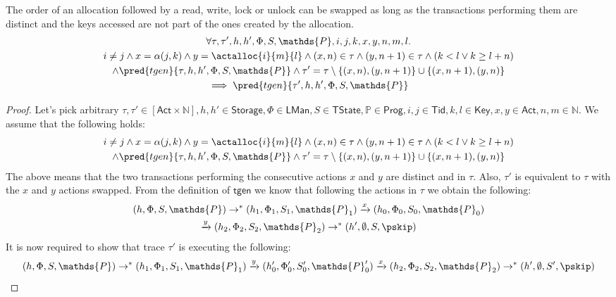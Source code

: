 \begin{lem}
	\label{lem:ax}
	The order of an allocation followed by a read, write, lock or unlock can be swapped as long as the transactions performing them are distinct and the keys accessed are not part of the ones created by the allocation.
	\begin{gather*}
		\forall \tau, \tau', h, h', \Phi, S, \mathds{P}, i, j, k, x, y, n, m, l \ldotp \\
			i \neq j \land x = \alpha(j, k) \land y = \actalloc{i}{m}{l} \land (x, n) \in \tau \land (y, n+1) \in \tau \land (k < l \lor k \geq l + n) \\ \land \pred{tgen}{\tau, h, h', \Phi, S, \mathds{P}} \land \tau' = \tau \setminus \{(x, n), (y, n+1)\} \cup \{ (x, n+1), (y, n) \}
			\\	 
		 \implies \pred{tgen}{\tau', h, h', \Phi, S, \mathds{P}}
	\end{gather*}
	\begin{proof}
	Let's pick arbitrary $\tau, \tau' \in [\mathsf{Act} \times \mathds{N}], h, h' \in \mathsf{Storage}, \Phi \in \mathsf{LMan}, S \in \mathsf{TState}, \mathds{P} \in \mathsf{Prog}, i, j \in \mathsf{Tid}, k, l \in \mathsf{Key}, x, y \in \mathsf{Act}, n, m \in \mathds{N}$. We assume that the following holds:
	\begin{gather*}
		i \neq j \land x = \alpha(j, k) \land y = \actalloc{i}{m}{l} \land (x, n) \in \tau \land (y, n+1) \in \tau \land (k < l \lor k \geq l + n) \\ \land \pred{tgen}{\tau, h, h', \Phi, S, \mathds{P}} \land \tau' = \tau \setminus \{(x, n), (y, n+1)\} \cup \{ (x, n+1), (y, n) \}
	\end{gather*}
	The above means that the two transactions performing the consecutive actions $x$ and $y$ are distinct and in $\tau$. Also, $\tau'$ is equivalent to $\tau$ with the $x$ and $y$ actions swapped. From the definition of $\mathsf{tgen}$ we know that following the actions in $\tau$ we obtain the following:
	\begin{gather}
		\label{lem:ax1} (h, \Phi, S, \mathds{P}) \rightarrow^* (h_1, \Phi_1, S_1, \mathds{P}_1) \xrightarrow{x} (h_0, \Phi_0, S_0, \mathds{P}_0) \\
		\label{lem:ax2} \xrightarrow{y} (h_2, \Phi_2, S_2, \mathds{P}_2) \rightarrow^* (h', \emptyset, S, \pskip)
	\end{gather}
	It is now required to show that trace $\tau'$ is executing the following:
	\[
		(h, \Phi, S, \mathds{P}) \rightarrow^* (h_1, \Phi_1, S_1, \mathds{P}_1) \xrightarrow{y} (h_0', \Phi_0', S_0', \mathds{P}_0') \xrightarrow{x} (h_2, \Phi_2, S_2, \mathds{P}_2) \rightarrow^* (h', \emptyset, S', \pskip)
\]
\end{proof}
\end{lem}

